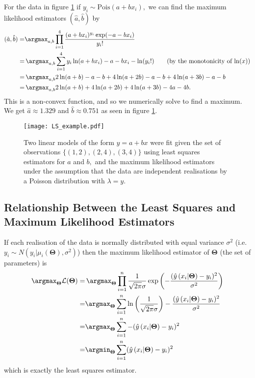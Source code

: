 
For the data in figure \ref{fig:LSE} if $y_i \sim \mathrm{Pois}(a + bx_i),$ we can find the maximum likelihood estimators $(\hat{a}, \hat{b})$ by
\begin{align*}
    (\hat{a}, \hat{b}) =& \argmax_{a, b}\prod_{i = 1}^{4} \frac{(a + bx_i)^{y_i}\exp(-a - bx_i)}{y_i!}\\
    =&\, \argmax_{a, b} \sum_{i = 1}^{4} y_i\ln(a + bx_i) - a - bx_i - \ln(y_i!)\tag{by the monotonicity of $\ln(x)$}\\
    =&\, \argmax_{a, b} 2\ln(a + b) - a - b + 4\ln(a + 2b) - a - b + 4\ln(a + 3b) - a - b\\
    =&\, \argmax_{a, b} 2\ln(a + b) + 4\ln(a + 2b) + 4\ln(a + 3b) - 4a - 4b.
\end{align*} This is a non-convex function, and so we numerically solve to find a maximum. We get $\hat{a} \approx 1.329$ and $\hat{b} \approx 0.751$ as seen in figure \ref{fig:LSE}.

\begin{figure}[ht]
    \centering
    \texttt{[image: LS\_example.pdf]}
    \caption{Two linear models of the form $y = a + bx$ were fit given the set of observations $\{(1, 2), (2, 4), (3, 4)\}$ using least squares estimators for $a$ and $b,$ and the maximum likelihood estimators under the assumption that the data are independent realisations by a Poisson distribution with $\lambda = y.$}
    \label{fig:LSE}
\end{figure}

\subsection*{Relationship Between the Least Squares and Maximum Likelihood Estimators}

If each realisation of the data is normally distributed with equal variance $\sigma^2$ (i.e. $y_i \sim N(y_i|\mu_i(\mathbf{\Theta}), \sigma^2)$) then the maximum likelihood estimator of $\mathbf{\Theta}$ (the set of parameters) is
\begin{align*}
    \argmax_{\mathbf{\Theta}}\mathcal{L}(\mathbf{\Theta}) =&\, \argmax_{\mathbf{\Theta}} \prod_{i = 1}^n \frac{1}{\sqrt{2\pi}\sigma}\exp\left(-\frac{(\hat{y}\left(x_i | \mathbf{\Theta}\right)- y_i)^2}{\sigma^2}\right)\\
    =& \argmax_{\mathbf{\Theta}} \sum_{i = 1}^n \ln\left(\frac{1}{\sqrt{2\pi}\sigma}\right) - \frac{(\hat{y}\left(x_i | \mathbf{\Theta}\right)- y_i)^2}{\sigma^2}\\
    =& \argmax_{\mathbf{\Theta}} \sum_{i = 1}^n - (\hat{y}\left(x_i | \mathbf{\Theta}\right)- y_i)^2\\
    =& \argmin_{\mathbf{\Theta}} \sum_{i = 1}^n (\hat{y}\left(x_i | \mathbf{\Theta}\right)- y_i)^2
\end{align*}
which is exactly the least squares estimator.

